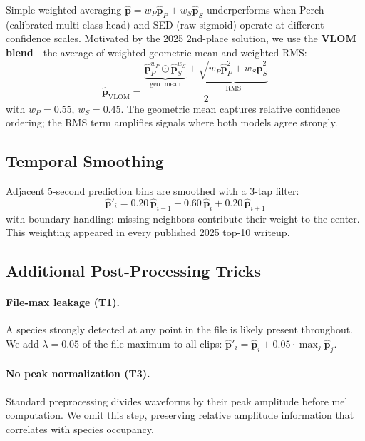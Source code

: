 \documentclass[10pt,twocolumn]{article}
\begin{document}
Simple weighted averaging $\hat{\bm{p}} = w_P\hat{\bm{p}}_P + w_S\hat{\bm{p}}_S$
underperforms when Perch (calibrated multi-class head) and SED (raw sigmoid)
operate at different confidence scales.
Motivated by the 2025 2nd-place solution, we use the
\textbf{VLOM blend}—the average of weighted geometric mean and weighted RMS:
\begin{equation}
  \hat{\bm{p}}_\text{VLOM} =
  \frac{
    \underbrace{\hat{\bm{p}}_P^{w_P} \odot \hat{\bm{p}}_S^{w_S}}_{\text{geo.\ mean}}
    +
    \underbrace{\sqrt{w_P \hat{\bm{p}}_P^2 + w_S \hat{\bm{p}}_S^2}}_{\text{RMS}}
  }{2}
  \label{eq:vlom}
\end{equation}
with $w_P=0.55$, $w_S=0.45$.
The geometric mean captures relative confidence ordering;
the RMS term amplifies signals where both models agree strongly.

\subsection{Temporal Smoothing}
\label{sec:smooth}

Adjacent 5-second prediction bins are smoothed with a 3-tap filter:
\begin{equation}
  \hat{\bm{p}}'_i = 0.20\,\hat{\bm{p}}_{i-1} + 0.60\,\hat{\bm{p}}_i + 0.20\,\hat{\bm{p}}_{i+1}
  \label{eq:smooth}
\end{equation}
with boundary handling: missing neighbors contribute their weight to the center.
This weighting appeared in every published 2025 top-10 writeup.

\subsection{Additional Post-Processing Tricks}
\label{sec:tricks}

\paragraph{File-max leakage (T1).}
A species strongly detected at any point in the file is likely present
throughout. We add $\lambda=0.05$ of the file-maximum to all clips:
$\hat{\bm{p}}'_i = \hat{\bm{p}}_i + 0.05 \cdot \max_j \hat{\bm{p}}_j$.

\paragraph{No peak normalization (T3).}
Standard preprocessing divides waveforms by their peak amplitude before
mel computation. We omit this step, preserving relative amplitude
information that correlates with species occupancy.
\end{document}
